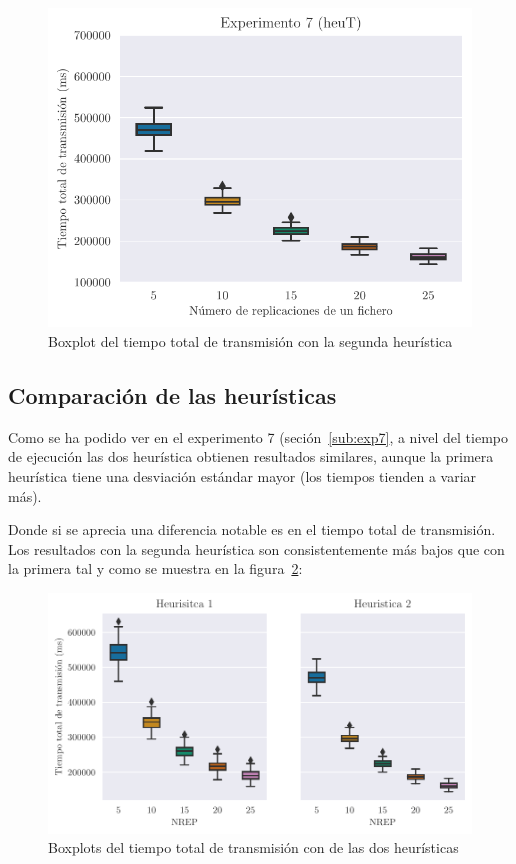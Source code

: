 \begin{figure}[H]
    \centering
    \includegraphics{include/plots/ex7_ttt_bplot_n.pdf}
    \caption{Boxplot del tiempo total de transmisión con la segunda heurística}%
    \label{fig:ex7ttt_total}
\end{figure}

\pagebreak
\subsection{Comparación de las heurísticas}

Como se ha podido ver en el experimento 7 (seción~\ref{sub:exp7}, 
a nivel del tiempo de ejecución las dos heurística obtienen resultados similares, aunque la primera
heurística tiene una desviación estándar mayor (los tiempos tienden a variar más).

Donde si se aprecia una diferencia notable es en el tiempo total de transmisión. Los resultados
con la segunda heurística son consistentemente más bajos que con la primera tal y como se muestra en
la figura~\ref{fig:ex7comp}:

\begin{figure}[H]
    \centering
    \includegraphics{include/plots/ex7_comp.pdf}
    \caption{Boxplots del tiempo total de transmisión con de las dos heurísticas}%
    \label{fig:ex7comp}
\end{figure}

